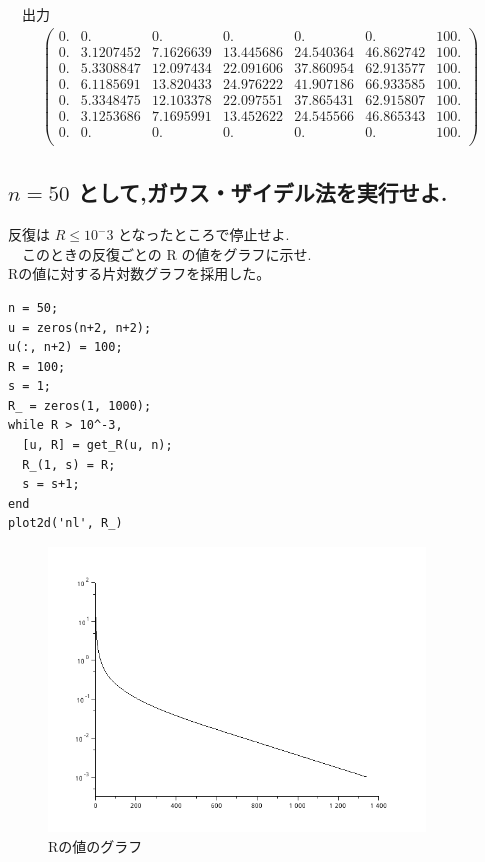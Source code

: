 \documentclass[a4j, 11pt]{jarticle}
\begin{document}
　出力\\
\begin{eqnarray*}
\left(   \begin{array}{lllllll}
0. & 0.        & 0.        & 0.        & 0.        & 0.        & 100. \\
0. & 3.1207452 & 7.1626639 & 13.445686 & 24.540364 & 46.862742 & 100. \\
0. & 5.3308847 & 12.097434 & 22.091606 & 37.860954 & 62.913577 & 100. \\
0. & 6.1185691 & 13.820433 & 24.976222 & 41.907186 & 66.933585 & 100. \\
0. & 5.3348475 & 12.103378 & 22.097551 & 37.865431 & 62.915807 & 100. \\
0. & 3.1253686 & 7.1695991 & 13.452622 & 24.545566 & 46.865343 & 100. \\
0. & 0.        & 0.        & 0.        & 0.        & 0.        & 100. \\
\end{array} \right)    
\end{eqnarray*}
\subsection{\(n = 50\) として,ガウス・ザイデル法を実行せよ.}
\label{sec:org5448c5f}
反復は \(R ≤ 10^−3\) となったところで停止せよ.\\
　このときの反復ごとの R の値をグラフに示せ.\\
Rの値に対する片対数グラフを採用した。\\
\begin{verbatim}
n = 50;
u = zeros(n+2, n+2);
u(:, n+2) = 100;
R = 100;
s = 1;
R_ = zeros(1, 1000);
while R > 10^-3,
  [u, R] = get_R(u, n);
  R_(1, s) = R;
  s = s+1;
end
plot2d('nl', R_)
\end{verbatim}

\begin{figure}[htbp]
\centering
\includegraphics[width=10cm]{./1-3.png}
\caption{Rの値のグラフ}
\end{figure}
\end{document}
